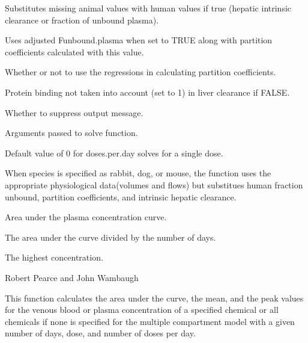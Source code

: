 \documentclass[a4paper]{book}
\begin{document}
\begin{Arguments}
\begin{ldescription}
\item[\code{default.to.human}] Substitutes missing animal values with human values
if true (hepatic intrinsic clearance or fraction of unbound plasma).

\item[\code{adjusted.Funbound.plasma}] Uses adjusted Funbound.plasma when set to
TRUE along with partition coefficients calculated with this value.

\item[\code{regression}] Whether or not to use the regressions in calculating
partition coefficients.

\item[\code{restrictive.clearance}] Protein binding not taken into account (set to
1) in liver clearance if FALSE.

\item[\code{suppress.messages}] Whether to suppress output message.

\item[\code{...}] Arguments passed to solve function.
\end{ldescription}
\end{Arguments}
%
\begin{Details}\relax
Default value of 0 for doses.per.day solves for a single dose.

When species is specified as rabbit, dog, or mouse, the function uses the
appropriate physiological data(volumes and flows) but substitues human
fraction unbound, partition coefficients, and intrinsic hepatic clearance.
\end{Details}
%
\begin{Value}
\begin{ldescription}
\item[\code{AUC}] Area under the plasma concentration curve.
\item[\code{mean.conc}] The area under the curve divided by the number of days.
\item[\code{peak.conc}] The highest concentration.
\end{ldescription}
\end{Value}
%
\begin{Author}\relax
Robert Pearce and John Wambaugh
\end{Author}
%
\begin{Description}\relax
This function calculates the area under the curve, the mean, and the peak values
for the venous blood or plasma concentration of a specified chemical or all
chemicals if none is specified for the multiple compartment model with a
given number of days, dose, and number of doses per day.
\end{Description}
\end{document}
